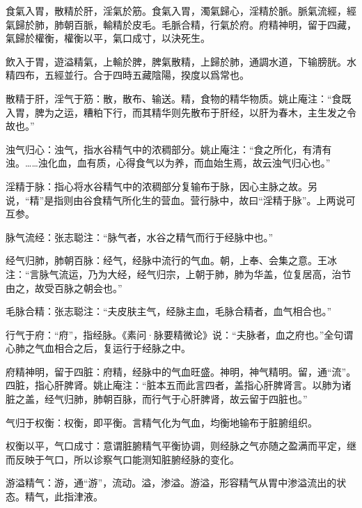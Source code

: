 \documentclass[12pt]{ctexbook}
\begin{document}

\begin{yuanwen}
食氣入胃，散精於肝，淫氣於筋。食氣入胃，濁氣歸心，淫精於脈。脈氣流經，經氣歸於肺，肺朝百脈，輸精於皮毛。毛脈合精，行氣於府。府精神明，留于四藏，氣歸於權衡，權衡以平，氣口成寸，以決死生。

飲入于胃，遊溢精氣，上輸於脾，脾氣散精，上歸於肺，通調水道，下输膀胱。水精四布，五經並行。合于四時五藏陰陽，揆度以爲常也。
\end{yuanwen}


\begin{jiaozhu}
  \item 散精于肝，淫气于筋：散，散布、输送。精，食物的精华物质。姚止庵注：“食既入胃，脾为之运，糟粕下行，而其精华则先散布于肝经，以肝为春木，主生发之令故也。”
  \item 浊气归心：浊气，指水谷精气中的浓稠部分。姚止庵注：“食之所化，有清有浊。……浊化血，血有质，心得食气以为养，而血始生焉，故云浊气归心也。”
  \item 淫精于脉：指心将水谷精气中的浓稠部分复输布于脉，因心主脉之故。另说，“精”是指则由谷食精气所化生的营血。营行脉中，故曰“淫精于脉”。上两说可互参。
  \item 脉气流经：张志聪注：“脉气者，水谷之精气而行于经脉中也。”
  \item 经气归肺，肺朝百脉：经气，经脉中流行的气血。朝，上奉、会集之意。王冰注：“言脉气流运，乃为大经，经气归宗，上朝于肺，肺为华盖，位复居高，治节由之，故受百脉之朝会也。”
  \item 毛脉合精：张志聪注：“夫皮肤主气，经脉主血，毛脉合精者，血气相合也。”
  \item 行气于府：“府”，指经脉。《素问·脉要精微论》说：“夫脉者，血之府也。”全句谓心肺之气血相合之后，复运行于经脉之中。
  \item 府精神明，留于四脏：府精，经脉中的气血旺盛。神明，神气精明。留，通“流”。四脏，指心肝脾肾。姚止庵注：“脏本五而此言四者，盖指心肝脾肾言。以肺为诸脏之盖，经气归肺，肺朝百脉，而行气于心肝脾肾，故云留于四脏也。”
  \item 气归于权衡：权衡，即平衡。言精气化为气血，均衡地输布于脏腑组织。
  \item 权衡以平，气口成寸：意谓脏腑精气平衡协调，则经脉之气亦随之盈满而平定，继而反映于气口，所以诊察气口能测知脏腑经脉的变化。
  \item 游溢精气：游，通“游”，流动。溢，渗溢。游溢，形容精气从胃中渗溢流出的状态。精气，此指津液。

\end{jiaozhu}
\end{document}
